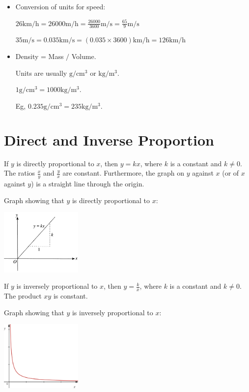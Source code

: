 \documentclass[twocolumn]{article}
\begin{document}
\begin{itemize}
\item Conversion of units for speed:

$26 \text{km}/\text{h} = 26000 \text{m}/\text{h} = \frac{26000}{3600}  \text{m}/\text{s} = \frac{65}{9} \text{m}/\text{s} $

$35 \text{m}/\text{s} = 0.035 \text{km}/\text{s} = (0.035 \times 3600) \text{km}/\text{h} = 126 \text{km}/\text{h}$

\item Density = Mass $/$ Volume.

Units are usually $\text{g}/\text{cm}^3$ or $\text{kg}/\text{m}^3$.

$1 \text{g}/\text{cm}^3 = 1000 \text{kg}/\text{m}^3$.

Eg, $0.235 \text{g}/\text{cm}^3 = 235 \text{kg}/\text{m}^3$.

\end{itemize}  

\section*{Direct and Inverse Proportion}

\noindent 
If $y$ is directly proportional to $x$, then $y=k x$, where $k$ is a constant and $k \neq 0$. The ratios $\frac{x}{y}$ and $\frac{y}{x}$ are constant. Furthermore, the graph on $y$ against $x$ (or of $x$ against $y$) is a straight line through the origin.

\noindent
Graph showing that $y$ is directly proportional to  $x$:

\includegraphics[width=0.3\textwidth]{01.png}

\bigskip 

\noindent 
If $y$ is inversely proportional to $x$, then $y=\frac{k}{x}$, where $k$ is a constant and $k \neq 0$. The product $xy$ is constant. 

\noindent
Graph showing that $y$ is inversely proportional to  $x$:

\includegraphics[width=0.3\textwidth]{02.png}
\end{document}
